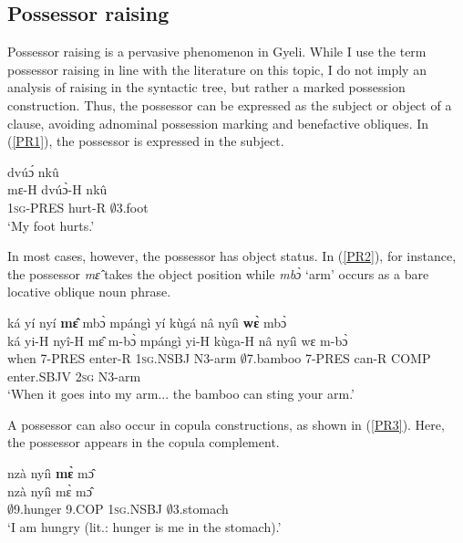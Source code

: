 \subsection{Possessor raising}
\label{sec:PossR}

Possessor raising is a pervasive phenomenon in Gyeli. While I use the term possessor raising in line with the literature on this topic, I do not imply an analysis of raising in the syntactic tree, but rather a marked possession construction.  Thus, the possessor can be expressed as the subject or object of a clause, avoiding adnominal possession marking and benefactive obliques.  In (\ref{PR1}), the possessor is expressed in the subject.


\begin{exe} 
\ex\label{PR1}
   dvúɔ́ nkû \\
          mɛ-H dvúɔ̀-H nkû \\
           1\textsc{sg}-PRES hurt-R $\emptyset$3.foot  \\
    \trans `My foot hurts.'
\end{exe}

In most cases, however, the possessor has object status. In (\ref{PR2}), for instance, the possessor {\itshape mɛ̂} takes the object position while {\itshape mbɔ̀} `arm' occurs as a bare locative oblique noun phrase.

\begin{exe} 
\ex\label{PR2}
  \glll    ká yí nyí {\bfseries mɛ̂} mbɔ̀ mpángì yí kùgá nâ nyíì {\bfseries wɛ̀} mbɔ̀ \\
           ká yi-H nyî-H mɛ̂ m-bɔ̀ mpángì yi-H kùga-H nâ nyíì wɛ m-bɔ̀ \\
             when 7-PRES enter-R 1\textsc{sg}.NSBJ N3-arm $\emptyset$7.bamboo 7-PRES can-R COMP enter.SBJV 2\textsc{sg} N3-arm  \\
    \trans `When it goes into my arm... the bamboo can sting your arm.'
\end{exe}

A possessor can also occur in copula constructions, as shown in (\ref{PR3}). Here, the possessor appears in the copula complement.

\begin{exe} 
\ex\label{PR3}
  \glll  nzà nyíì {\bfseries mɛ̀} mɔ̂ \\
          nzà nyíì mɛ̀ mɔ̂ \\
           $\emptyset$9.hunger 9.COP 1\textsc{sg}.NSBJ $\emptyset$3.stomach  \\
    \trans `I am hungry (lit.: hunger is me in the stomach).'
\end{exe}

